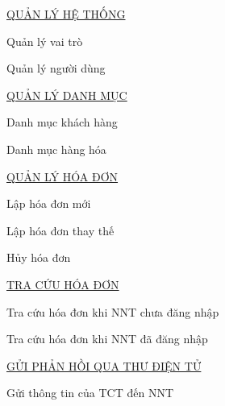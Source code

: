 \underline{\textsc{QUẢN LÝ HỆ THỐNG}}

Quản lý vai trò

Quản lý người dùng

\underline{\textsc{QUẢN LÝ DANH MỤC}}

Danh mục khách hàng

Danh mục hàng hóa

\underline{\textsc{QUẢN LÝ HÓA ĐƠN}}

Lập hóa đơn mới

Lập hóa đơn thay thế

Hủy hóa đơn

\underline{\textsc{TRA CỨU HÓA ĐƠN}}

Tra cứu hóa đơn khi NNT chưa đăng nhập

Tra cứu hóa đơn khi NNT đã đăng nhập

\underline{\textsc{GỬI PHẢN HỒI QUA THƯ ĐIỆN TỬ}}

Gửi thông tin của TCT đến NNT